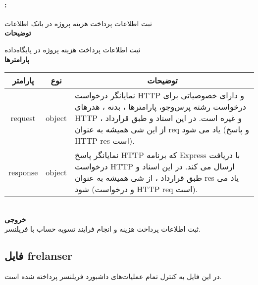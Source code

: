 \paragraph{:}
ثبت اطلاعات پرداخت هزینه پروژه در بانک اطلاعات
\\
\textbf{توضیحات}
\hr
\begin{flushleft}
	\framebox[.9\textwidth][l]{
		\lr{
			\textcolor{type}{void}
			\textcolor{func}{postInvoiceProject}
			\textcolor{symb}{(}
			\textcolor{type}{object}
			\textcolor{arg}{request}
			\textcolor{symb}{,}
			\textcolor{type}{object}
			\textcolor{arg}{response}
			\textcolor{symb}{);}
		}
	}
\end{flushleft}
ثبت اطلاعات پرداخت هزینه پروژه در پایگاه‌داده
\\
\textbf{پارامترها}
\hr \\[10pt]
\begin{tabular}{|m{4cm}|m{3cm}|m{10cm}|}
	\hline
	\multicolumn{1}{|c}{پارامتر}
	&
	\multicolumn{1}{|c}{نوع}
	&
	\multicolumn{1}{|c|}{توضیحات}
	\\
	\hline
	\multicolumn{1}{|c}{request}
	&
	\multicolumn{1}{|c|}{object}
	&
	نمایانگر درخواست HTTP و دارای خصوصیاتی برای درخواست رشته پرس‌و‌جو، پارامترها ، بدنه ، هدرهای HTTP و غیره است.
	در این اسناد و طبق قرارداد ، از این شی همیشه به عنوان req یاد می شود (و پاسخ HTTP res است).
	\\
	\hline
	\multicolumn{1}{|c}{response}
	&
	\multicolumn{1}{|c|}{object}
	&
	نمایانگر پاسخ HTTP که برنامه Express با دریافت درخواست HTTP ارسال می کند.
	در این اسناد و طبق قرارداد ، از شی همیشه به عنوان res یاد می شود (و درخواست HTTP req است).
	\\
	\hline
\end{tabular}
\\[10pt]
\textbf{خروجی}
\hr \\
ثبت اطلاعات پرداخت هزینه و انجام فرایند تسویه حساب با فریلنسر.


\subsection{فایل frelanser}
در این فایل به کنترل تمام عملیات‌های داشبورد فریلنسر پرداخته شده است.

